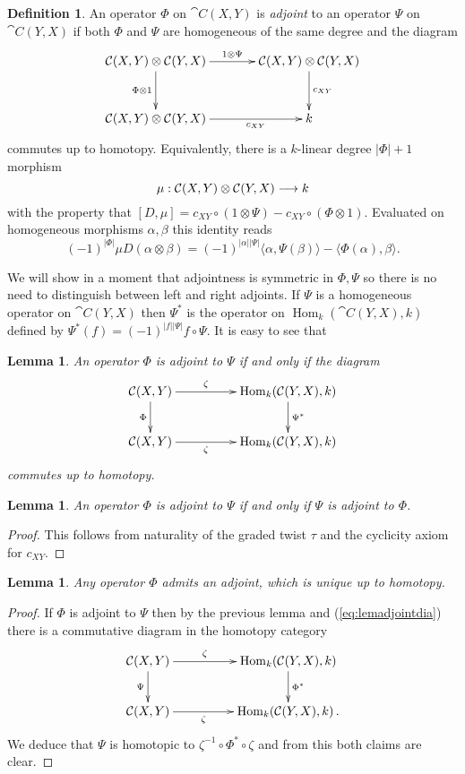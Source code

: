 \documentclass{compositio}
\newtheorem{lemma}[theorem]{Lemma}
\theoremstyle{definition}
\newtheorem{definition}[theorem]{Definition}
\numberwithin{equation}{section}
\def\Hom{\operatorname{Hom}}
\begin{document}
\begin{definition} An operator $\Phi$ on $\cat{C}(X,Y)$ is \emph{adjoint} to an operator $\Psi$ on $\cat{C}(Y,X)$ if both $\Phi$ and $\Psi$ are homogeneous of the same degree and the diagram
\[
\xymatrix@C+1pc@R+0.5pc{
\cat{C}(X,Y) \otimes \cat{C}(Y,X) \ar[d]_{\Phi \otimes 1} \ar[r]^{1 \otimes \Psi} & \cat{C}(X,Y) \otimes \cat{C}(Y,X) \ar[d]^{c_{XY}}\\
\cat{C}(X,Y) \otimes \cat{C}(Y,X) \ar[r]_-{c_{XY}} & k
}
\]
commutes up to homotopy. Equivalently, there is a $k$-linear degree $|\Phi|+1$ morphism
\[
\mu: \mathcal{C}(X,Y) \otimes \mathcal{C}(Y,X) \longrightarrow k
\]
with the property that $[D, \mu] = c_{XY} \circ (1 \otimes \Psi) - c_{XY} \circ ( \Phi \otimes 1)$. Evaluated on homogeneous morphisms $\alpha, \beta$ this identity reads
\[
(-1)^{|\Phi|} \mu D(\alpha \otimes \beta) = (-1)^{|\alpha||\Psi|}\langle \alpha, \Psi(\beta) \rangle - \langle \Phi(\alpha) , \beta \rangle.
\]
\end{definition}

We will show in a moment that adjointness is symmetric in $\Phi, \Psi$ so there is no need to distinguish between left and right adjoints. If $\Psi$ is a homogeneous operator on $\cat{C}(Y,X)$ then $\Psi^*$ is the operator on $\Hom_k(\cat{C}(Y,X),k)$ defined by $\Psi^*(f) = (-1)^{|f||\Psi|} f \circ \Psi$. It is easy to see that

\begin{lemma} An operator $\Phi$ is adjoint to $\Psi$ if and only if the diagram
\begin{equation}\label{eq:lemadjointdia}
\xymatrix@C+2pc{
\cat{C}(X,Y) \ar[d]_\Phi \ar[r]^-{\zeta} & \Hom_k( \cat{C}(Y,X), k ) \ar[d]^{\Psi^*}\\
\cat{C}(X,Y) \ar[r]_-{\zeta} & \Hom_k( \cat{C}(Y,X), k)
}
\end{equation}
commutes up to homotopy.
\end{lemma}

\begin{lemma} An operator $\Phi$ is adjoint to $\Psi$ if and only if $\Psi$ is adjoint to $\Phi$.
\end{lemma}
\begin{proof}
This follows from naturality of the graded twist $\tau$ and the cyclicity axiom for $c_{XY}$.
\end{proof}

\begin{lemma} Any operator $\Phi$ admits an adjoint, which is unique up to homotopy. 
\end{lemma}
\begin{proof}
If $\Phi$ is adjoint to $\Psi$ then by the previous lemma and (\ref{eq:lemadjointdia}) there is a commutative diagram in the homotopy category
\[
\xymatrix@C+2pc{
\cat{C}(X,Y) \ar[d]_\Psi \ar[r]^-{\zeta} & \Hom_k( \cat{C}(Y,X), k ) \ar[d]^{\Phi^*}\\
\cat{C}(X,Y) \ar[r]_-{\zeta} & \Hom_k( \cat{C}(Y,X), k)\,.
}
\]
We deduce that $\Psi$ is homotopic to $\zeta^{-1} \circ \Phi^* \circ \zeta$ and from this both claims are clear.
\end{proof}
\end{document}
